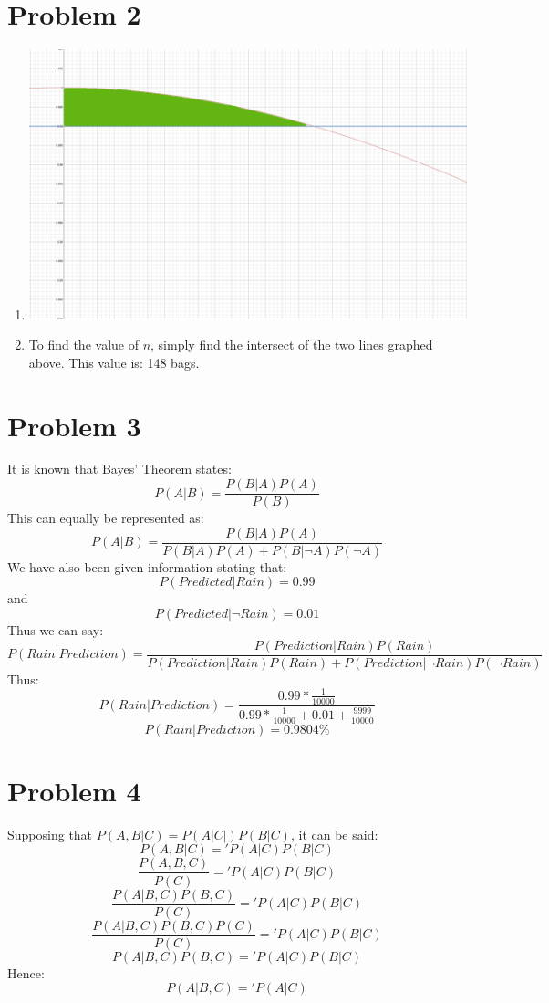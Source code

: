 \documentclass[12pt]{article}%
\begin{document}
\section*{Problem 2}
    \begin{enumerate}[1.]
        \item
            \includegraphics[scale=.25]{graphone}
        \item
            To find the value of $n$, simply find the intersect of the two lines graphed above. This value is: 148 bags.
    \end{enumerate}
    
\section*{Problem 3}
    It is known that Bayes' Theorem states:
    \[P(A|B) = \frac{P(B|A)P(A)}{P(B)}\]
    This can equally be represented as:
    \[P(A|B) = \frac{P(B|A)P(A)}{P(B|A)P(A)+P(B|\neg A)P(\neg A)}\]
    We have also been given information stating that:
    \[P(Predicted|Rain) = 0.99\]
    and
    \[P(Predicted|\neg Rain) = 0.01\]
    Thus we can say:
    \[P(Rain|Prediction) = \frac{P(Prediction|Rain)P(Rain)}{P(Prediction|Rain)P(Rain)+P(Prediction|\neg Rain)P(\neg Rain)}\]
    Thus:
    \[P(Rain|Prediction) = \frac{0.99 * \frac{1}{10000}}{0.99 * \frac{1}{10000} + 0.01 + \frac{9999}{10000}}\]
    \[P(Rain|Prediction) = 0.9804\%\]

\section*{Problem 4}
    Supposing that $P(A,B|C) = P(A|C|)P(B|C)$, it can be said:
    \[P(A,B|C) = 'P(A|C)P(B|C)\]
    \[\frac{P(A,B,C)}{P(C)} = 'P(A|C)P(B|C)\]
    \[\frac{P(A|B,C)P(B,C)}{P(C)} = 'P(A|C)P(B|C)\]
    \[\frac{P(A|B,C)P(B,C)P(C)}{P(C)} = 'P(A|C)P(B|C)\]
    \[P(A|B,C)P(B,C) = 'P(A|C)P(B|C)\]
    Hence:
    \[P(A|B,C) = 'P(A|C)\]
\end{document}
